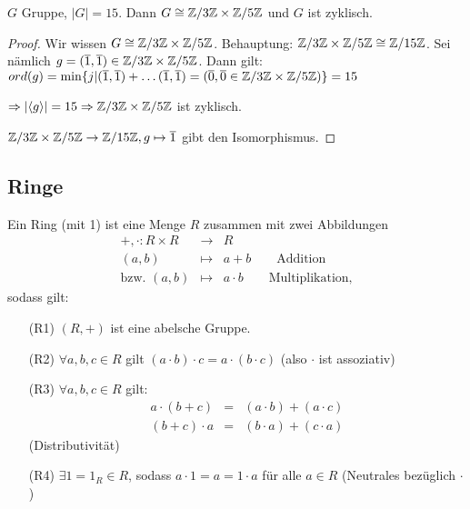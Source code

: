 \documentclass[12pt,a4paper]{scrartcl}
\begin{document}
\begin{kor}
	$G$ Gruppe, $|G| = 15$. Dann $G\cong \mathbb Z/3\mathbb Z\times \mathbb Z/5\mathbb Z$ und $G$ ist zyklisch.
\end{kor}

\begin{proof}
	Wir wissen $G \cong \mathbb Z/3\mathbb Z\times \mathbb Z/5\mathbb Z$. Behauptung: $ \mathbb Z/3\mathbb Z\times \mathbb Z/5\mathbb Z\cong \mathbb Z/15\mathbb Z$. Sei nämlich $g = (\overline{1}, \overline{1})\in  \mathbb Z/3\mathbb Z\times \mathbb Z/5\mathbb Z$. Dann gilt: $ord(g) = \min \{j|(\overline{1},\overline{1})+\dots (\overline{1},\overline{1}) = (\overline{0}, \overline{0}\in  \mathbb Z/3\mathbb Z\times \mathbb Z/5\mathbb Z)\}  =15$
	
	$\Rightarrow |\langle g\rangle| = 15 \Rightarrow  \mathbb Z/3\mathbb Z\times \mathbb Z/5\mathbb Z$ ist zyklisch.
	
	$ \mathbb Z/3\mathbb Z\times \mathbb Z/5\mathbb Z\to \mathbb Z/15\mathbb Z, g\mapsto \overline{1}$ gibt den Isomorphismus.
\end{proof}


\subsection{Ringe}
\begin{defi} Ein Ring (mit 1) ist eine Menge $R$ zusammen mit zwei Abbildungen
	\begin{eqnarray*}
		+,\cdot \colon R\times R &\to & R\\
		(a,b)&\mapsto& a+b \qquad \text{Addition}\\
		\text{bzw. }(a,b)&\mapsto& a\cdot b\qquad\text{Multiplikation,}
	\end{eqnarray*}
sodass gilt:
\begin{itemize}
	\item[(R1)] $(R,+)$ ist eine abelsche Gruppe.
	\item[(R2)] $\forall a,b,c\in R$ gilt $(a\cdot b)\cdot c = a\cdot (b\cdot c)$ (also $\cdot$ ist assoziativ)
	\item[(R3)] $\forall a,b,c\in R$ gilt:
	\begin{eqnarray*}
		a\cdot(b+c) &=& (a\cdot b)+ (a\cdot c)\\
		(b+c)\cdot a& =& (b\cdot a)+(c\cdot a)
	\end{eqnarray*} (Distributivität)
	\item[(R4)] $\exists 1 = 1_R\in R$, sodass $a\cdot 1 = a = 1\cdot a$ für alle $a\in R$ (Neutrales bezüglich $\cdot$)
\end{itemize}
\end{defi}
\end{document}
